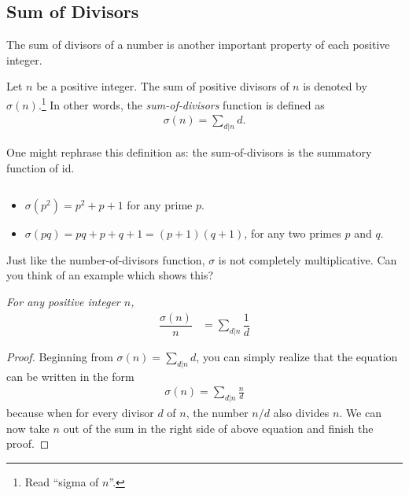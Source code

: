 \documentclass[12pt]{subfile}
\begin{document}
	\subsection{Sum of Divisors}\label{sec:sum-of-divisors}
		The sum of divisors of a number is another important property of each positive integer.

		\begin{definition}
			Let $n$ be a positive integer. The sum of positive divisors of $n$ is denoted by $\sigma(n)$.\footnote{Read ``sigma of $n$''.} In other words, the \textit{sum-of-divisors} function is defined as
			\begin{align*}
			\sigma(n)=\sum_{d|n} d.
			\end{align*}
		\end{definition}

		\begin{note}
			One might rephrase this definition as: the sum-of-divisors is the summatory function of $\text{id}$.
		\end{note}

		\begin{example}
			$ $
			\begin{itemize}
				\item $\sigma(p^2) = p^2+p+1$ for any prime $p$.
				\item $\sigma(pq)=pq+p+q+1=(p+1)(q+1)$, for any two primes $p$ and $q$.
			\end{itemize}
		\end{example}



		\begin{note}
			Just like the number-of-divisors function, $\sigma$ is not completely multiplicative. Can you think of an example which shows this?
		\end{note}

		\begin{theorem}\slshape\label{thm:sodfrac}
			For any positive integer $n$,
				\begin{align*}
					\dfrac{\sigma (n)}{n} & = \sum_{d|n}\dfrac{1}{d}
				\end{align*}
		\end{theorem}

		\begin{proof}
			Beginning from $\sigma(n) = \sum\limits_{d|n} d$, you can simply realize that the equation can be written in the form
			\begin{align*}
			\sigma(n) = \sum_{d|n} \frac{n}{d}
			\end{align*}
			because when for every divisor $d$ of $n$, the number $n/d$ also divides $n$. We can now take $n$ out of the sum in the right side of above equation and finish the proof.
		\end{proof}
\end{document}
